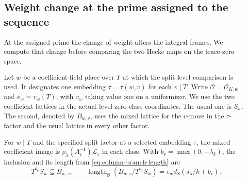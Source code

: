 \subsection{Weight change at the prime assigned to the sequence}
\label{sec:ramified-weight-change}

At the assigned prime the change of weight alters the integral frames. We compute that change before comparing the two Hecke maps on the trace-zero space.

Let \(w\) be a coefficient-field place over \(T\) at which
the split level comparison is used. It designates one
embedding \(\tau=\tau(w,v)\) for each \(v\mid T\).
Write \(\mathcal O=\mathcal O_{K,w}\) and \(e_w=v_w(T)\),
with \(v_w\) taking value one on a uniformizer. We use
the two coefficient lattices in the actual level-zero
class coordinates. The usual one is \(S_w\). The second,
denoted by \(B_{w,v}\), uses the mixed lattice for the
\(v\)-move in the \(\tau\)-factor and the usual lattice
in every other factor.

\begin{proposition}\label{prop:ramified-mixed-column}
For \(w\mid T\) and the specified split factor at a selected
embedding \(\tau\), the mixed coefficient image is
\(\rho_\lambda(A_c^{-1})\mathcal L_c\) in each class.
With \(b_v=\max(0,-\lambda_k)\), the inclusion and its length from \eqref{eq:column-branch-length} are
\[
 T^{b_v}S_w\subseteq B_{w,v},\qquad \operatorname{length}_{\mathcal O}(B_{w,v}/T^{b_v}S_w)=e_wd_S(s_\lambda/k+b_v).
\]

\end{proposition}

